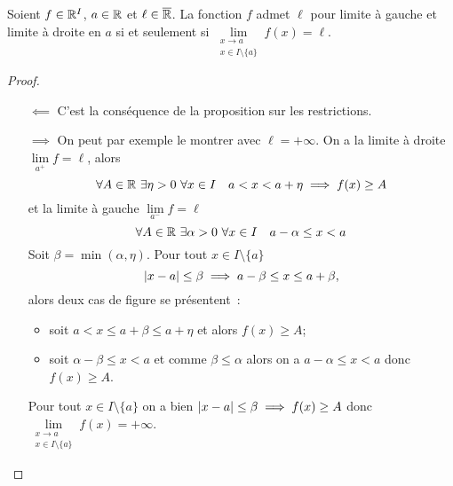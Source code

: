 \begin{prop}
  Soient $f \in \mathbb{R}^I$, $a \in \mathbb{R}$ et $\ell \in \overline{\mathbb{R}}$. La fonction $f$ admet $\ell$ pour limite à gauche et limite à droite en $a$ si et seulement si $\lim\limits_{\begin{array}{c} x \to a \\ x \in I\setminus\{a\}\end{array}}f(x)=\ell$.
\end{prop}
\begin{proof}
  \begin{itemize}
  \item[$\impliedby$] C'est la conséquence de la proposition sur les restrictions.
  \item[$\implies$] On peut par exemple le montrer avec $\ell=+\infty$. On a la limite à droite $\lim\limits_{a^{+}}f=\ell$, alors
    \begin{equation}
      \forall A \in \mathbb{R} \ \exists \eta > 0 \ \forall x \in I \quad a < x < a + \eta \implies f(x) \geq A
    \end{equation}
    et la limite à gauche $\lim\limits_{a^{-}}f=\ell$
    \begin{equation}
      \forall A \in \R \ \exists \alpha > 0 \ \forall x \in I \quad a-\alpha \leq x < a
    \end{equation}
    Soit $\beta=\min(\alpha, \eta)$. Pour tout $x \in I\setminus\{a\}$
    \begin{equation}
      \left\lvert x-a\right\rvert \leq \beta \implies a-\beta \leq x \leq a+\beta,
    \end{equation}
    alors deux cas de figure se présentent~:
    \begin{itemize}
    \item soit $a < x \leq a+\beta \leq a + \eta$ et alors $f(x) \geq A$;
    \item soit $\alpha - \beta \leq x < a$ et comme $\beta \leq \alpha$ alors on a $a-\alpha \leq x < a$ donc $f(x) \geq A$.
    \end{itemize}
    Pour tout $x \in I\setminus\{a\}$ on a bien $\left\lvert x-a\right\rvert\leq \beta \implies f(x) \geq A$ donc $\lim\limits_{\begin{array}{l} x \to a \\ x \in I\setminus\{a\}\end{array}}f(x)=+\infty$.
  \end{itemize}
\end{proof}

